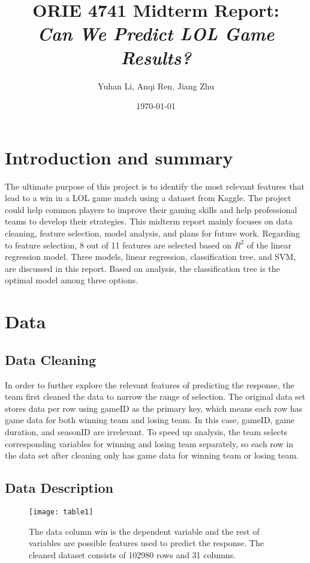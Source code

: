\documentclass[10.5pt]{article}
\title{\textbf{}ORIE 4741 Midterm Report: \\ \textit{Can We Predict LOL Game Results?}}}
\date{\today}
\author{Yuhan Li, Anqi Ren, Jiang Zhu}
\begin{document}
\maketitle 

\section{Introduction and summary}

The ultimate purpose of this project is to identify the most relevant features that lead to a win in a LOL game match using a dataset from Kaggle. The project could help common players to improve their gaming skills and help professional teams to develop their strategies. This midterm report mainly focuses on data cleaning, feature selection, model analysis, and plans for future work. Regarding to feature selection, 8 out of 11 features are selected based on $R^2$ of the linear  regression model. Three models, linear regression, classification tree, and SVM, are discussed in this report. Based on analysis, the classification tree is the optimal model among three options.

\section{Data}
\subsection{Data Cleaning}
In order to further explore the relevant features of predicting the response, the team first cleaned the data to narrow the range of selection. The original data set stores data per row using gameID as the primary key, which means each row has game data for both winning team and losing team. In this case, gameID, game duration, and seasonID are irrelevant. To speed up analysis, the team selects corresponding variables for winning and losing team separately, so each row in the data set after cleaning only has game data for winning team or losing team. 

\subsection{Data Description}
\begin{figure}[h]
\centering
\texttt{[image: table1]}
\caption{The data column win is the dependent variable and the rest of variables are possible features used to predict the response.  The cleaned dataset consists of 102980 rows and 31 columns.}
\end{figure}
\end{document}
